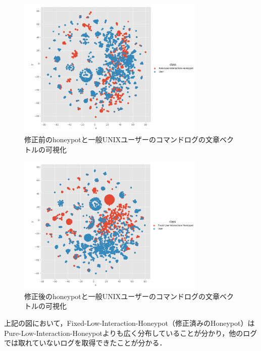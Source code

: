 \vspace{10mm}
\begin{figure}[htbp]
    \centering
    \includegraphics[width=0.8\textwidth]{figures/suuser.png}
    \caption{修正前のhoneypotと一般UNIXユーザーのコマンドログの文章ベクトルの可視化}
    \label{fig:tsne2}
\end{figure}
\vspace{10mm}

\vspace{10mm}
\begin{figure}[htbp]
    \centering
    \includegraphics[width=0.8\textwidth]{figures/fixuser.png}
    \caption{修正後のhoneypotと一般UNIXユーザーのコマンドログの文章ベクトルの可視化}
    \label{fig:tsne3}
\end{figure}
\vspace{10mm}

上記の図において，Fixed-Low-Interaction-Honeypot（修正済みのHoneypot）はPure-Low-Interaction-Honeypotよりも広く分布していることが分かり，他のログでは取れていないログを取得できたことが分かる．



